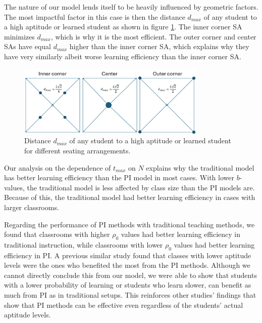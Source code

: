 The nature of our model lends itself to be heavily influenced by geometric factors. 
The most impactful factor in this case is then the distance $d_{max}$ of any student to a high aptitude or learned student as shown in figure \ref{fig:SA dmax}. 
The inner corner SA minimizes $d_{max}$, which is why it is the most efficient. 
The outer corner and center SAs have equal $d_{max}$ higher than the inner corner SA, which explains why they have very similarly albeit worse learning efficiency than the inner corner SA.

\begin{figure}[htbp!]
    \centering
    \includegraphics[width=0.8\textwidth]{figures/SA dmax.png}
    \caption{Distance $d_{max}$ of any student to a high aptitude or learned student for different seating arrangements.}
    \label{fig:SA dmax}
\end{figure}

Our analysis on the dependence of $t_{max}$ on $N$ explains why the traditional model has better learning efficiency than the PI model in most cases. 
With lower $b$-values, the traditional model is less affected by class size than the PI models are. 
Because of this, the traditional model had better learning efficiency in cases with larger classrooms. 

Regarding the performance of PI methods with traditional teaching methods, we found that classrooms with higher $\rho_0$ values had better learning efficiency in traditional instruction, while classrooms with lower $\rho_0$ values had  better learning efficiency in PI. 
A previous similar study \cite{roxas2010seating} found that classes with lower aptitude levels were the ones who benefited the most from the PI methods.
Although we cannot directly conclude this from our model, we were able to show that students with a lower probability of learning or students who learn slower, can benefit as much from PI as in traditional setups. 
This reinforces other studies' findings \cite{lasry2008peer} that show that PI methods can be effective even regardless of the students' actual aptitude levels.

    
